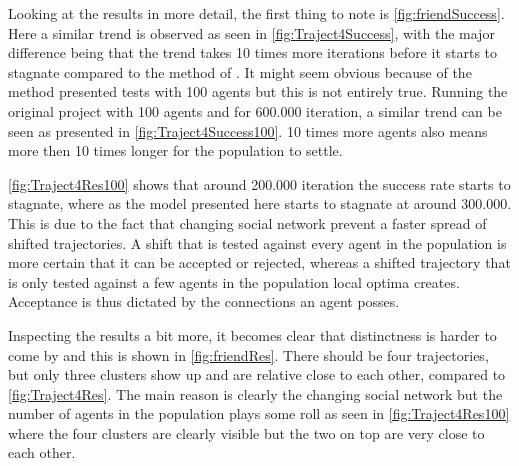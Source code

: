 Looking at the results in more detail, the first thing to note is \autoref{fig:friendSuccess}.
Here a similar trend is observed as seen in \autoref{fig:Traject4Success}, with the major difference being that the trend takes 10 times more iterations before it starts to stagnate compared to the method of \cite{de2010multi}.
It might seem obvious because of the method presented tests with 100 agents but this is not entirely true.
Running the original project with 100 agents and for 600.000 iteration, a similar trend can be seen as presented in \autoref{fig:Traject4Success100}.
10 times more agents also means more then 10 times longer for the population to settle.

\autoref{fig:Traject4Res100} shows that around 200.000 iteration the success rate starts to stagnate, where as the model presented here starts to stagnate at around 300.000.
This is due to the fact that changing social network prevent a faster spread of shifted trajectories.
A shift that is tested against every agent in the population is more certain that it can be accepted or rejected, whereas a shifted trajectory that is only tested against a few agents in the population local optima creates.
Acceptance is thus dictated by the connections an agent posses.


Inspecting the results a bit more, it becomes clear that distinctness is harder to come by and this is shown in \autoref{fig:friendRes}.
There should be four trajectories, but only three clusters show up and are relative close to each other, compared to \autoref{fig:Traject4Res}.
The main reason is clearly the changing social network but the number of agents in the population plays some roll as seen in \autoref{fig:Traject4Res100} where the four clusters are clearly visible but the two on top are very close to each other.


